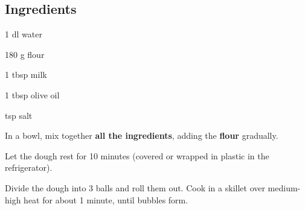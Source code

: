 \newpage
{}

\subsection*{Ingredients}
\begin{ingredients}
	\item 1 dl water
	\item 180 g flour
	\item 1 tbsp milk
	\item 1 tbsp olive oil
	\item {} tsp salt
\end{ingredients}

\medskip

In a bowl, mix together \textbf{all the ingredients}, adding the \textbf{flour} gradually.

Let the dough rest for 10 minutes (covered or wrapped in plastic in the refrigerator).

Divide the dough into 3 balls and roll them out. Cook in a skillet over medium-high heat for about 1 minute, until bubbles form.

\vspace*{0.75 cm}

\begin{recipeblock}
	
\end{recipeblock}
